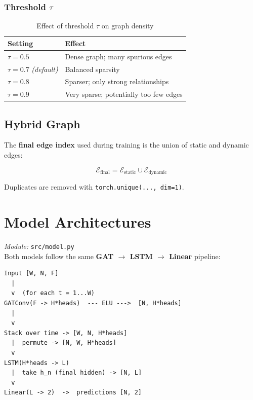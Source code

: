 \documentclass[12pt,a4paper]{article}
\newcommand{\codeinline}[1]{\texttt{\small #1}}
\begin{document}
\subsubsection{Threshold $\tau$}

\begin{table}[H]
\centering
\begin{tabular}{C{2.5cm} L{9cm}}
\toprule
\textbf{Setting} & \textbf{Effect} \\
\midrule
$\tau = 0.5$ & Dense graph; many spurious edges \\
$\tau = 0.7$ \textit{(default)} & Balanced sparsity \\
$\tau = 0.8$ & Sparser; only strong relationships \\
$\tau = 0.9$ & Very sparse; potentially too few edges \\
\bottomrule
\end{tabular}
\caption{Effect of threshold $\tau$ on graph density}
\end{table}

\subsection{Hybrid Graph}
The \textbf{final edge index} used during training is the union of static and dynamic edges:

\begin{equation}
  \mathcal{E}_{\text{final}} = \mathcal{E}_{\text{static}} \cup \mathcal{E}_{\text{dynamic}}
\end{equation}

Duplicates are removed with \codeinline{torch.unique(..., dim=1)}.

\section{Model Architectures}

\textit{Module:} \codeinline{src/model.py}\\
Both models follow the same \textbf{GAT $\to$ LSTM $\to$ Linear} pipeline:

\begin{lstlisting}
Input [W, N, F]
  |
  v  (for each t = 1...W)
GATConv(F -> H*heads)  --- ELU --->  [N, H*heads]
  |
  v
Stack over time -> [W, N, H*heads]
  |  permute -> [N, W, H*heads]
  v
LSTM(H*heads -> L)
  |  take h_n (final hidden) -> [N, L]
  v
Linear(L -> 2)  ->  predictions [N, 2]
\end{lstlisting}
\end{document}
